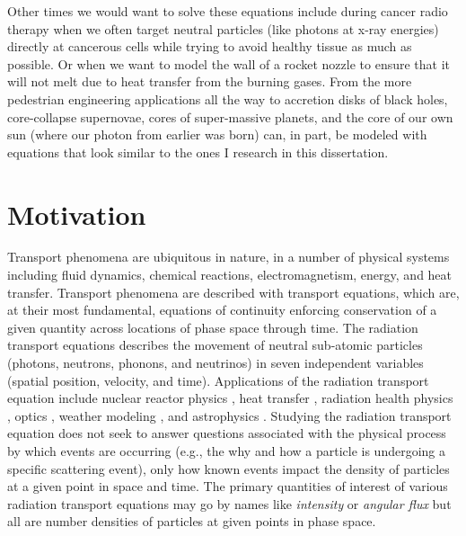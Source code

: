 Other times we would want to solve these equations include during cancer radio therapy when we often target  neutral particles (like photons at x-ray energies) directly at cancerous cells while trying to avoid healthy tissue as much as possible.
Or when we want to model the wall of a rocket nozzle to ensure that it will not melt due to heat transfer from the burning gases.
From the more pedestrian engineering applications all the way to accretion disks of black holes, core-collapse supernovae, cores of super-massive planets, and the core of our own sun (where our photon from earlier was born) can, in part, be modeled with equations that look similar to the ones I research in this dissertation.


\section{Motivation}

Transport phenomena are ubiquitous in nature, in a number of physical systems including fluid dynamics, chemical reactions, electromagnetism, energy, and heat transfer.
Transport phenomena are described with transport equations, which are, at their most fundamental, equations of continuity enforcing conservation of a given quantity across locations of phase space through time.
The radiation transport equations describes the movement of neutral sub-atomic particles (photons, neutrons, phonons, and neutrinos) in seven independent variables (spatial position, velocity, and time).
Applications of the radiation transport equation include nuclear reactor physics \cite{duderstadt_hamilton}, heat transfer \cite{radheattrans2003}, radiation health physics \cite{martelli_2010_light}, optics \cite{wang_2007_optics}, weather modeling \cite{liou_2002_atmospheric}, and astrophysics \cite{chandrasekhar1960radiative}.
Studying the radiation transport equation does not seek to answer questions associated with the physical process by which events are occurring (e.g., the why and how a particle is undergoing a specific scattering event), only how known events impact the density of particles at a given point in space and time.
The primary quantities of interest of various radiation transport equations may go by names like \emph{intensity} or \emph{angular flux} but all are number densities of particles at given points in phase space.

